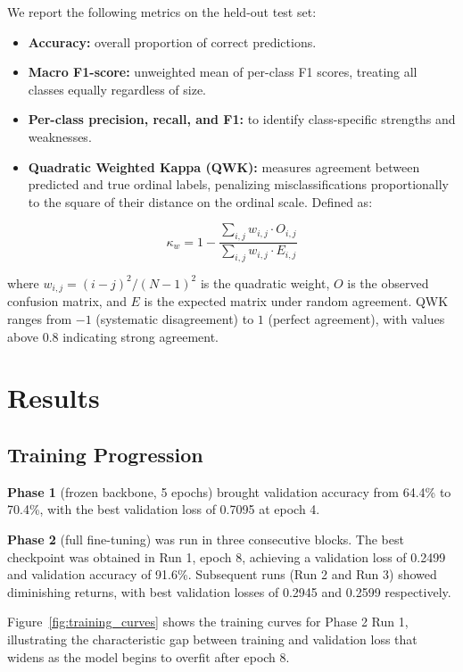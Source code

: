 \documentclass[conference]{IEEEtran}
\begin{document}
We report the following metrics on the held-out test set:

\begin{itemize}
    \item \textbf{Accuracy:} overall proportion of correct predictions.
    \item \textbf{Macro F1-score:} unweighted mean of per-class F1 scores, treating all classes equally regardless of size.
    \item \textbf{Per-class precision, recall, and F1:} to identify class-specific strengths and weaknesses.
    \item \textbf{Quadratic Weighted Kappa (QWK):} measures agreement between predicted and true ordinal labels, penalizing misclassifications proportionally to the square of their distance on the ordinal scale. Defined as:
\end{itemize}

\begin{equation}
    \kappa_w = 1 - \frac{\sum_{i,j} w_{i,j} \cdot O_{i,j}}{\sum_{i,j} w_{i,j} \cdot E_{i,j}}
\end{equation}

where $w_{i,j} = (i - j)^2 / (N-1)^2$ is the quadratic weight, $O$ is the observed confusion matrix, and $E$ is the expected matrix under random agreement.
QWK ranges from $-1$ (systematic disagreement) to $1$ (perfect agreement), with values above 0.8 indicating strong agreement.

\section{Results}
\label{sec:results}

\subsection{Training Progression}

\textbf{Phase 1} (frozen backbone, 5 epochs) brought validation accuracy from 64.4\% to 70.4\%, with the best validation loss of 0.7095 at epoch 4.

\textbf{Phase 2} (full fine-tuning) was run in three consecutive blocks.
The best checkpoint was obtained in Run 1, epoch 8, achieving a validation loss of 0.2499 and validation accuracy of 91.6\%.
Subsequent runs (Run 2 and Run 3) showed diminishing returns, with best validation losses of 0.2945 and 0.2599 respectively.

Figure~\ref{fig:training_curves} shows the training curves for Phase 2 Run 1, illustrating the characteristic gap between training and validation loss that widens as the model begins to overfit after epoch 8.
\end{document}
